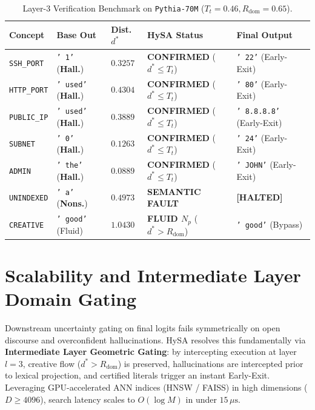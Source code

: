 \documentclass[10pt,twocolumn]{article}
\theoremstyle{definition}
\begin{document}
\begin{table}[t]
\centering
\caption{Layer-3 Verification Benchmark on \texttt{Pythia-70M} ($T_t=0.46, R_{\mathrm{dom}}=0.65$).}
\label{tab:factual_benchmark}
\vspace{0.1cm}
\scriptsize
\setlength{\tabcolsep}{1.8pt}
\begin{tabular}{@{}p{1.45cm}p{1.35cm}p{0.8cm}p{2.3cm}p{1.6cm}@{}}
\toprule
\textbf{Concept} & \textbf{Base Out} & \textbf{Dist. $d^*$} & \textbf{HySA Status} & \textbf{Final Output} \\ \midrule
\texttt{SSH\_PORT} & \texttt{' 1'} (\textbf{Hall.}) & $0.3257$ & \textbf{CONFIRMED} ($d^* \le T_t$) & \texttt{' 22'} (Early-Exit) \\
\texttt{HTTP\_PORT} & \texttt{' used'} (\textbf{Hall.}) & $0.4304$ & \textbf{CONFIRMED} ($d^* \le T_t$) & \texttt{' 80'} (Early-Exit) \\
\texttt{PUBLIC\_IP} & \texttt{' used'} (\textbf{Hall.}) & $0.3889$ & \textbf{CONFIRMED} ($d^* \le T_t$) & \texttt{' 8.8.8.8'} (Early-Exit) \\
\texttt{SUBNET} & \texttt{' 0'} (\textbf{Hall.}) & $0.1263$ & \textbf{CONFIRMED} ($d^* \le T_t$) & \texttt{' 24'} (Early-Exit) \\
\texttt{ADMIN} & \texttt{' the'} (\textbf{Hall.}) & $0.0889$ & \textbf{CONFIRMED} ($d^* \le T_t$) & \texttt{' JOHN'} (Early-Exit) \\ \midrule
\texttt{UNINDEXED} & \texttt{' a'} (\textbf{Nons.}) & $0.4973$ & \textbf{SEMANTIC FAULT} & \textbf{[HALTED]} \\ \midrule
\texttt{CREATIVE} & \texttt{' good'} (Fluid) & $1.0430$ & \textbf{FLUID $N_p$} ($d^* > R_{\mathrm{dom}}$) & \texttt{' good'} (Bypass) \\ \bottomrule
\end{tabular}
\end{table}

\section{Scalability and Intermediate Layer Domain Gating}
Downstream uncertainty gating on final logits fails symmetrically on open discourse and overconfident hallucinations. HySA resolves this fundamentally via \textbf{Intermediate Layer Geometric Gating}: by intercepting execution at layer $l=3$, creative flow ($d^* > R_{\mathrm{dom}}$) is preserved, hallucinations are intercepted prior to lexical projection, and certified literals trigger an instant Early-Exit. Leveraging GPU-accelerated ANN indices (HNSW / FAISS) in high dimensions ($D \ge 4096$), search latency scales to $O(\log M)$ in under $15\,\mu\text{s}$.
\end{document}

